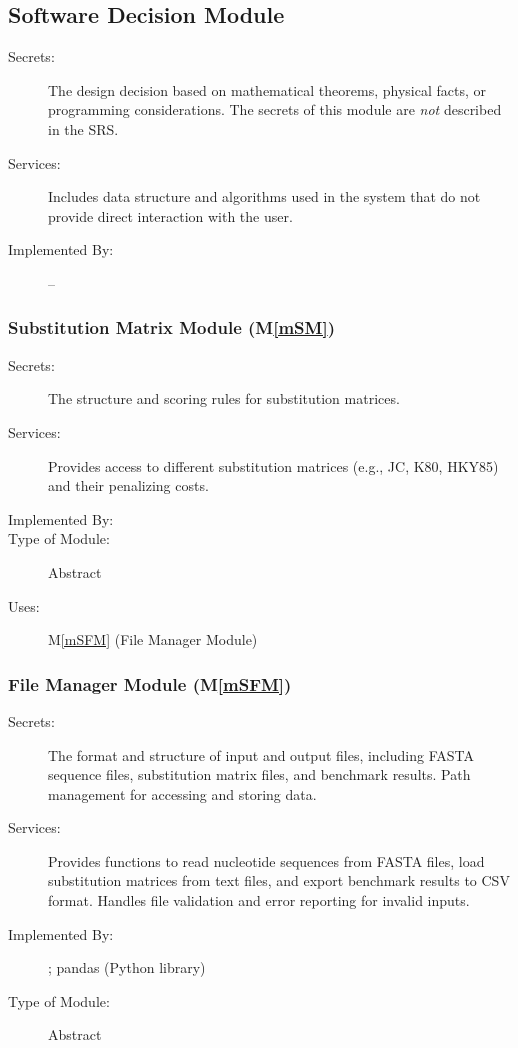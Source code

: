 \documentclass[12pt, titlepage]{article}
\newcommand{\mref}[1]{M\ref{#1}}
\begin{document}

\subsection{Software Decision Module}

\begin{description}
\item[Secrets:] The design decision based on mathematical theorems, physical
  facts, or programming considerations. The secrets of this module are
  \emph{not} described in the SRS.
\item[Services:] Includes data structure and algorithms used in the system that
  do not provide direct interaction with the user. 
\item[Implemented By:] --
\end{description}

\subsubsection{Substitution Matrix Module (\mref{mSM})}

\begin{description}
  \item[Secrets:] The structure and scoring rules for substitution matrices.
  \item[Services:] Provides access to different substitution matrices (e.g., JC, K80, HKY85) and their penalizing costs.
  \item[Implemented By:] \progname{}
  \item[Type of Module:] Abstract 
  \item[Uses:] \mref{mSFM} (File Manager Module)
\end{description}

\subsubsection{File Manager Module (\mref{mSFM})}

\begin{description}
  \item[Secrets:] The format and structure of input and output files, including FASTA sequence files, substitution matrix files, and benchmark results. Path management for accessing and storing data.
  \item[Services:] Provides functions to read nucleotide sequences from FASTA files, load substitution matrices from text files, and export benchmark results to CSV format. Handles file validation and error reporting for invalid inputs.
  \item[Implemented By:] \progname{}; pandas (Python library)
  \item[Type of Module:] Abstract
\end{description}
\end{document}
